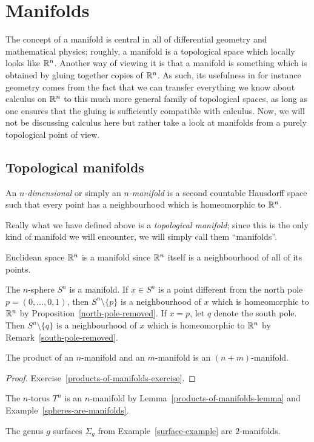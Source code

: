 \section{Manifolds}
\label{manifolds}
The concept of a manifold is central in all of differential geometry and mathematical physics; roughly, a manifold is a topological space which locally looks like $\mathbb{R}^n$. Another way of viewing it is that a manifold is something which is obtained by gluing together copies of $\mathbb{R}^n$. As such, its usefulness in for instance geometry comes from the fact that we can transfer everything we know about calculus on $\mathbb{R}^n$ to this much more general family of topological spaces, as long as one ensures that the gluing is sufficiently compatible with calculus. Now, we will not be discussing calculus here but rather take a look at manifolds from a purely topological point of view.

\subsection{Topological manifolds}
\begin{defn}
  An \emph{$n$-dimensional}  or simply an \emph{$n$-manifold} is a second countable Hausdorff space such that every point has a neighbourhood which is homeomorphic to $\mathbb{R}^n$.
\end{defn}
Really what we have defined above is a \emph{topological manifold}; since this is the only kind of manifold we will encounter, we will simply call them ``manifolds''.
\begin{example}
  Euclidean space $\mathbb{R}^n$ is a manifold since $\mathbb{R}^n$ itself is a neighbourhood of all of its points.
\end{example}
\begin{example}
  \label{spheres-are-manifolds}
  The $n$-sphere $S^n$ is a manifold. If $x \in S^n$ is a point different from the north pole $p = (0,\dots,0,1)$, then $S^n \setminus \{p\}$ is a neighbourhood of $x$ which is homeomorphic to $\mathbb{R}^n$ by Proposition~\ref{north-pole-removed}. If $x = p$, let $q$ denote the south pole. Then $S^n \setminus \{q\}$ is a neighbourhood of $x$ which is homeomorphic to $\mathbb{R}^n$ by Remark~\ref{south-pole-removed}.
\end{example}
\begin{lem}
  \label{products-of-manifolds-lemma}
  The product of an $n$-manifold and an $m$-manifold is an $(n+m)$-manifold.
\end{lem}
\begin{proof}
  Exercise~\ref{products-of-manifolds-exercise}.
\end{proof}
\begin{example}
  The $n$-torus $T^n$ is an $n$-manifold by Lemma~\ref{products-of-manifolds-lemma} and Example~\ref{spheres-are-manifolds}.
\end{example}
\begin{example}
  The genus $g$ surfaces $\Sigma_g$ from Example~\ref{surface-example} are $2$-manifolds.
\end{example}

